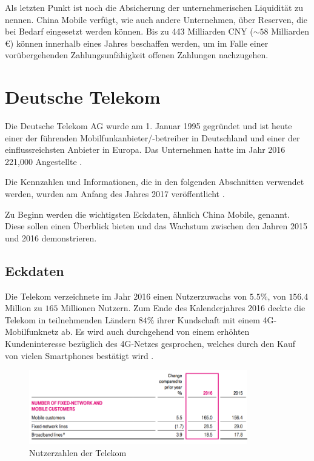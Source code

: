 Als letzten Punkt ist noch die Absicherung der unternehmerischen Liquidität zu nennen. China Mobile verfügt, wie auch andere Unternehmen, über Reserven, die bei Bedarf eingesetzt werden können. Bis zu 443 Milliarden CNY ($\sim 58$ Milliarden \euro) können innerhalb eines Jahres beschaffen werden, um im Falle einer vorübergehenden Zahlungsunfähigkeit offenen Zahlungen nachzugehen. 

\section{Deutsche Telekom}

Die Deutsche Telekom AG wurde am 1. Januar 1995 gegründet und ist heute einer der führenden Mobilfunkanbieter/-betreiber in Deutschland und einer der einflussreichsten Anbieter in Europa. Das Unternehmen hatte im Jahr 2016 221,000 Angestellte \cite{telekomsite}.

Die Kennzahlen und Informationen, die in den folgenden Abschnitten verwendet werden, wurden am Anfang des Jahres 2017 veröffentlicht \cite{telekomreport}. 

Zu Beginn werden die wichtigsten Eckdaten, ähnlich China Mobile, genannt. Diese sollen einen Überblick bieten und das Wachstum zwischen den Jahren 2015 und 2016 demonstrieren. 

\subsection{Eckdaten}

Die Telekom verzeichnete im Jahr 2016 einen Nutzerzuwachs von $5.5\%$, von $156.4$ Million zu $165$ Millionen Nutzern. Zum Ende des Kalenderjahres 2016 deckte die Telekom in teilnehmenden Ländern $84\%$ ihrer Kundschaft mit einem 4G-Mobilfunknetz ab. Es wird auch durchgehend von einem erhöhten Kundeninteresse bezüglich des 4G-Netzes gesprochen, welches durch den Kauf von vielen Smartphones bestätigt wird \cite{telekomreport}.


\begin{figure}[H]
\centering
\includegraphics[width=0.85\textwidth]{pictures/telekom_nutzer.png}
\caption{Nutzerzahlen der Telekom \cite{telekomreport}}
\label{fig:telekom}
\end{figure}

